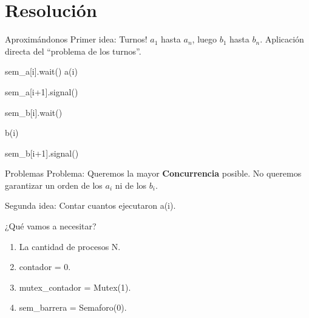 \documentclass[pdf]{beamer}
\newcommand{\quotes}[1]{``#1''}
\begin{document}
\section{Resolución}
\begin{frame}{Aproximándonos}
    Primer idea: \pause Turnos! 
    \pause 
    \newline $a_1$ hasta $a_n$, luego $b_1$ hasta $b_n$.
    Aplicación directa del \quotes{problema de los turnos}.
    
    \vspace{2em}
    
    \pause
    \begin{algorithmic}
    
         
            \State sem\_a[i].wait()
            \vspace{1em}
            \State a(i)
            \vspace{1em}
            
            \State sem\_a[i+1].signal()
            \vspace{1em}
            
            \State sem\_b[i].wait()
            \vspace{1em}
            
            \State b(i)
            \vspace{1em}
            
            \State sem\_b[i+1].signal()
        
        \EndFunction
        
    \end{algorithmic}
    
    \pause
\end{frame}

\begin{frame}{Problemas}
    Problema: Queremos la mayor \textbf{Concurrencia} posible. 
    No queremos garantizar un orden de los $a_i$ ni de los $b_i$. 
    
    \vspace{2em}
    
    \pause
    
    Segunda idea: Contar cuantos ejecutaron a(i).
\end{frame}

\begin{frame}{¿Qué vamos a necesitar?}
    \begin{enumerate}
        \item La cantidad de procesos N.
        \item contador = 0.
        \item mutex\_contador = Mutex(1).
        \item sem\_barrera = Semaforo(0).
    \end{enumerate}
\end{frame}
\end{document}
